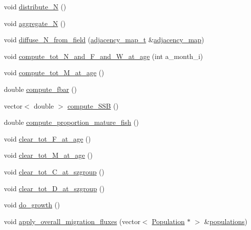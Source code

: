 \begin{DoxyCompactItemize}
\item 
void \mbox{\hyperlink{class_population_a74bfbe305219943ffd5602522dee560d}{distribute\+\_\+N}} ()
\item 
void \mbox{\hyperlink{class_population_a46938d98d5c48398f90a95f48ed47ee7}{aggregate\+\_\+N}} ()
\item 
void \mbox{\hyperlink{class_population_a02d833abb4f7964cbbbb284cfa9ef7bd}{diffuse\+\_\+\+N\+\_\+from\+\_\+field}} (\mbox{\hyperlink{myutils_8h_ae689dbcb43e66abf9a513718b83bd87d}{adjacency\+\_\+map\+\_\+t}} \&\mbox{\hyperlink{thread__vessels_8cpp_ada1040d49789f59db85b5c6096b3313d}{adjacency\+\_\+map}})
\item 
void \mbox{\hyperlink{class_population_afd955edc34d65c1d75dd13fce5921b15}{compute\+\_\+tot\+\_\+\+N\+\_\+and\+\_\+\+F\+\_\+and\+\_\+\+W\+\_\+at\+\_\+age}} (int a\+\_\+month\+\_\+i)
\item 
void \mbox{\hyperlink{class_population_a488c03ba52c1d02d71f4e3a164c0ae8f}{compute\+\_\+tot\+\_\+\+M\+\_\+at\+\_\+age}} ()
\item 
double \mbox{\hyperlink{class_population_a07c919c348429c55bcfdadb80bf9927b}{compute\+\_\+fbar}} ()
\item 
vector$<$ double $>$ \mbox{\hyperlink{class_population_a2e8e32eaa8932724f5eec702b6ebc96f}{compute\+\_\+\+S\+SB}} ()
\item 
double \mbox{\hyperlink{class_population_a9bd54eb05f4b4e4bb1c1203428389d3e}{compute\+\_\+proportion\+\_\+mature\+\_\+fish}} ()
\item 
void \mbox{\hyperlink{class_population_a6526e780c4db4034a1b719099daabaf4}{clear\+\_\+tot\+\_\+\+F\+\_\+at\+\_\+age}} ()
\item 
void \mbox{\hyperlink{class_population_a5082ae70cba9d5cd25e6fbd0302ff243}{clear\+\_\+tot\+\_\+\+M\+\_\+at\+\_\+age}} ()
\item 
void \mbox{\hyperlink{class_population_a76b64f23119ccb0f397a98a6a41f980a}{clear\+\_\+tot\+\_\+\+C\+\_\+at\+\_\+szgroup}} ()
\item 
void \mbox{\hyperlink{class_population_a635315f1caef18e1dc73e2f25feb16b2}{clear\+\_\+tot\+\_\+\+D\+\_\+at\+\_\+szgroup}} ()
\item 
void \mbox{\hyperlink{class_population_a208537e5f8ca4de371198c1b7fd2893a}{do\+\_\+growth}} ()
\item 
void \mbox{\hyperlink{class_population_aaa602f9f37a968aabe3c257b67d994a6}{apply\+\_\+overall\+\_\+migration\+\_\+fluxes}} (vector$<$ \mbox{\hyperlink{class_population}{Population}} $\ast$ $>$ \&\mbox{\hyperlink{thread__vessels_8cpp_a52b340841e812112c424c384bb9e7ebc}{populations}})

\end{DoxyCompactItemize}
